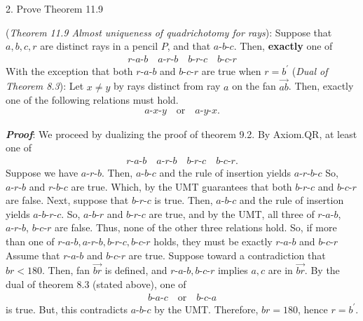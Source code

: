 \documentclass{report}
\begin{document}
    \bigbreak \noindent 
    \begin{mdframed}
        2. Prove Theorem 11.9
    \end{mdframed}
    \bigbreak \noindent 
    \begin{remark}
        (\textit{Theorem 11.9 Almost uniqueness of quadrichotomy for rays}): Suppose that $a,b,c,r$ are distinct rays in a pencil $P$, and that $ a\text{-}b\text{-}c$. Then, \textbf{exactly} one of 
        \begin{align*}
            r\text{-}a\text{-}b \quad a\text{-}r\text{-}b \quad b\text{-}r\text{-}c \quad b\text{-}c\text{-}r
        \end{align*}
        With the exception that both $ r\text{-}a\text{-}b $ and $ b\text{-}c\text{-}r$ are true when $r = b^{\prime} $
        \bigbreak \noindent 
        (\textit{Dual of Theorem 8.3}): Let $x \ne y$ by rays distinct from ray $a$ on the fan $ \overrightarrow{ab}$. Then, exactly one of the following relations must hold.
        \begin{align*}
            a\text{-}x\text{-}y \quad \text{or} \quad a\text{-}y\text{-}x
        .\end{align*}
    \end{remark}
    \bigbreak \noindent 
    \textbf{\textit{Proof}}: We proceed by dualizing the proof of theorem 9.2.
    \bigbreak \noindent 
    By Axiom.QR, at least one of 
    \begin{align*}
        r\text{-}a\text{-}b \quad a\text{-}r\text{-}b \quad b\text{-}r\text{-}c \quad b\text{-}c\text{-}r
    .\end{align*}
    Suppose we have $ a\text{-}r\text{-}b$. Then, $ a\text{-}b\text{-}c$ and the rule of insertion yields $ a\text{-}r\text{-}b\text{-}c $
    \bigbreak \noindent 
    So, $ a\text{-}r\text{-}b $ and $ r\text{-}b\text{-}c$ are true. Which, by the UMT guarantees that both $ b\text{-}r\text{-}c $ and $ b\text{-}c\text{-}r$ are false. 
    \bigbreak \noindent 
    Next, suppose that $ b\text{-}r\text{-}c$ is true. Then, $ a\text{-}b\text{-}c$ and the rule of insertion yields $ a\text{-}b\text{-}r\text{-}c$. So, $ a\text{-}b\text{-}r$ and $ b\text{-}r\text{-}c$ are true, and by the UMT, all three of  $ r\text{-}a\text{-}b$, $ a\text{-}r\text{-}b$, $ b\text{-}c\text{-}r$ are false. Thus, none of the other three relations hold.
    \bigbreak \noindent 
    So, if more than one of $ r\text{-}a\text{-}b, a\text{-}r\text{-}b, b\text{-}r\text{-}c, b\text{-}c\text{-}r$ holds, they must be exactly $ r\text{-}a\text{-}b$ and $ b\text{-}c\text{-}r$
    \bigbreak \noindent 
    Assume that $ r\text{-}a\text{-}b$ and $ b\text{-}c\text{-}r$ are true. Suppose toward a contradiction that $br < 180$. Then, fan $\overrightarrow{br}$ is defined, and $ r\text{-}a\text{-}b, b\text{-}c\text{-}r$ implies $a,c$ are in $ \overrightarrow{br}$. By the dual of theorem 8.3 (stated above), one of 
    \begin{align*}
        b\text{-}a\text{-}c \quad \text{or} \quad b\text{-}c\text{-}a
    \end{align*}
    is true. But, this contradicts $ a\text{-}b\text{-}c$ by the UMT. 
    \bigbreak \noindent 
    Therefore, $br = 180$, hence $ r = b^{\prime}$. \endpf
    
\end{document}
